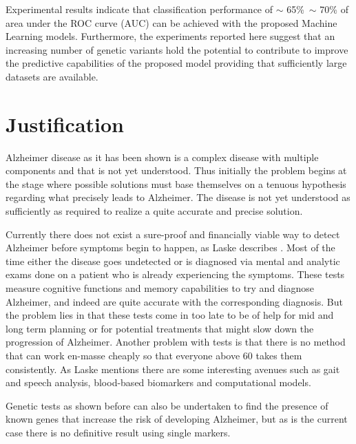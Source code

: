 Experimental results indicate that classification performance of $\sim$ 65\%~$\sim$ 70\% of area under the ROC curve (AUC) can be achieved with the proposed Machine Learning models. Furthermore, the experiments reported here suggest that an increasing number of genetic variants hold the potential to contribute to improve the predictive capabilities of the proposed model providing that sufficiently large datasets are available.
\newpage
\section{Justification} \label{justification}

Alzheimer disease as it has been shown is a complex disease with multiple components and that is not yet understood. Thus initially the problem begins at the stage where possible solutions must base themselves on a tenuous hypothesis regarding what precisely leads to Alzheimer. The disease is not yet understood as sufficiently as required to realize a quite accurate and precise solution. 

Currently there does not exist a sure-proof and financially viable way to detect Alzheimer before symptoms begin to happen, as Laske describes \cite{LASKE2015561}. Most of the time either the disease goes undetected or is diagnosed via mental and analytic exams done on a patient who is already experiencing the symptoms. These tests measure cognitive functions and memory capabilities to try and diagnose Alzheimer, and indeed are quite accurate with the corresponding diagnosis. But the problem lies in that these tests come in too late to be of help for mid and long term planning or for potential treatments that might slow down the progression of Alzheimer. Another problem with tests is that there is no method that can work en-masse cheaply so that everyone above 60 takes them consistently. As Laske mentions \cite{LASKE2015561} there are some interesting avenues such as  gait and speech analysis, blood-based biomarkers and computational models.

Genetic tests as shown before can also be undertaken to find the presence of known genes that increase the risk of developing Alzheimer, but as is the current case there is no definitive result using single markers.


